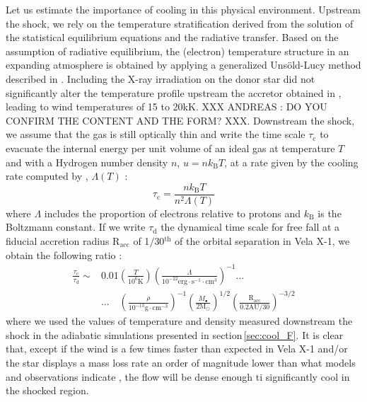 \documentclass{aa}
\begin{document}
Let us estimate the importance of cooling in this physical environment. Upstream the shock, we rely on the temperature stratification derived from the solution of the statistical equilibrium equations and the radiative transfer. Based on the assumption of radiative equilibrium, the (electron) temperature structure in an expanding atmosphere is obtained by applying a generalized Uns{\"o}ld-Lucy method described in \citet{Hamann1998}. Including the X-ray irradiation on the donor star did not significantly alter the temperature profile upstream the accretor obtained in \cite{Sander2017}, leading to wind temperatures of 15 to 20kK. XXX ANDREAS : DO YOU CONFIRM THE CONTENT AND THE FORM? XXX. Downstream the shock, we assume that the gas is still optically thin and write the time scale $\tau_{\text{c}}$ to evacuate the internal energy per unit volume of an ideal gas at temperature $T$ and with a Hydrogen number density $n$, $u=nk_{\text{B}}T$, at a rate given by the cooling rate computed by \cite{Schure2009}, $\Lambda\left(T\right)$ :
\begin{equation}
\tau_{\text{c}}=\frac{nk_{\text{B}}T}{n^2\Lambda\left(T\right)}
\end{equation}
where $\Lambda$ includes the proportion of electrons relative to protons and $k_{\text{B}}$ is the Boltzmann constant. If we write $\tau_{\text{d}}$ the dynamical time scale for free fall at a fiducial accretion radius R$_{\text{acc}}$ of 1$/$30$^{\text{th}}$ of the orbital separation in Vela X-1, we obtain the following ratio :
\begin{align}
\frac{\tau_{\text{c}}}{\tau_{\text{d}}}\sim & 0.01\left(\frac{T}{10^6\text{K}}\right)\left(\frac{\Lambda}{10^{-22}\text{erg}\cdot\text{s}^{-1}\cdot\text{cm}^{3}}\right)^{-1} \text{...}\\
&  \text{...} \quad \left(\frac{\rho}{10^{-13}\text{g}\cdot\text{cm}^{-3}}\right)^{-1}\left(\frac{M_{\bullet}}{2\text{M}_{\odot}}\right)^{1/2}\left(\frac{\text{R}_{\text{acc}}}{0.2\text{AU}/30}\right)^{-3/2}
\end{align}
where we used the values of temperature and density measured downstream the shock in the adiabatic simulations presented in section\,\ref{sec:cool_F}. It is clear that, except if the wind is a few times faster than expected in Vela X-1 and/or the star displays a mass loss rate an order of magnitude lower than what models and observations indicate \cite[$\sim$1.3$\cdot 10^{-6}$M$_{\odot}\cdot$yr$^{-1}$,][]{Gimenez-Garcia2016}, the flow will be dense enough ti significantly cool in the shocked region.
\end{document}

